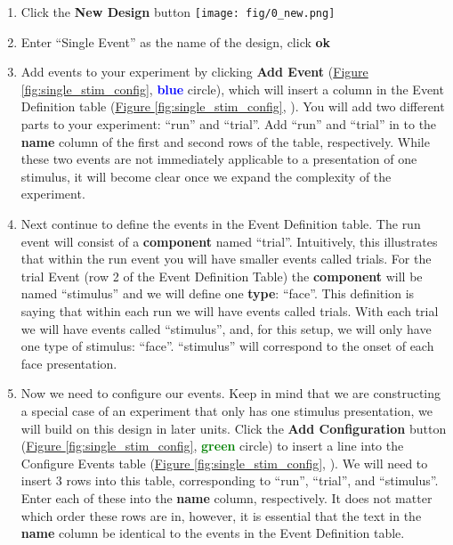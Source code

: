 \documentclass[10pt]{article}
\newcommand*\circled[1]{\tikz[baseline=(char.base)]{
            \node[shape=circle,draw,inner sep=.5pt] (char) {#1};}}
\newcommand*{\nbut}{\texttt{[image: fig/0\_new.png]}}
\begin{document}
		\begin{enumerate}
			\item Click the \textbf{New Design} button \nbut{}
			\item Enter ``Single Event'' as the name of the design, click \textbf{ok}
			\item Add events to your experiment by clicking \textbf{Add Event} (\hyperref[fig:single_stim_config]{Figure \ref{fig:single_stim_config}}, \textcolor{blue}{\textbf{blue}} circle), which will insert a column in the Event Definition table (\hyperref[fig:single_stim_config]{Figure \ref{fig:single_stim_config}}, \circled{1}). You will add two different parts to your experiment: ``run'' and ``trial''.
			Add ``run'' and ``trial'' in to the \textbf{name} column of the first and second rows of the table, respectively.
			While these two events are not immediately applicable to a presentation of one stimulus, it will become clear once we expand the complexity of the experiment.
			\item Next continue to define the events in the Event Definition table.
			The run event will consist of a \textbf{component} named ``trial''. Intuitively, this illustrates that within the run event you will have smaller events called trials.
			For the trial Event (row 2 of the Event Definition Table) the \textbf{component} will be named ``stimulus'' and we will define one \textbf{type}: ``face''.
			This definition is saying that within each run we will have events called trials.
			With each trial we will have events called ``stimulus'', and, for this setup, we will only have one type of stimulus: ``face''.
			``stimulus'' will correspond to the onset of each face presentation.
			\item Now we need to configure our events.
			Keep in mind that we are constructing a special case of an experiment that only has one stimulus presentation, we will build on this design in later units.
			Click the \textbf{Add Configuration} button (\hyperref[fig:single_stim_config]{Figure \ref{fig:single_stim_config}}, \textcolor{green}{\textbf{green}} circle) to insert a line into the Configure Events table (\hyperref[fig:single_stim_config]{Figure \ref{fig:single_stim_config}}, \circled{2}).
			We will need to insert 3 rows into this table, corresponding to ``run'', ``trial'', and ``stimulus''.
			Enter each of these into the \textbf{name} column, respectively.
			It does not matter which order these rows are in, however, it is essential that the text in the \textbf{name} column be identical to the events in the Event Definition table.

\end{enumerate}
\end{document}
